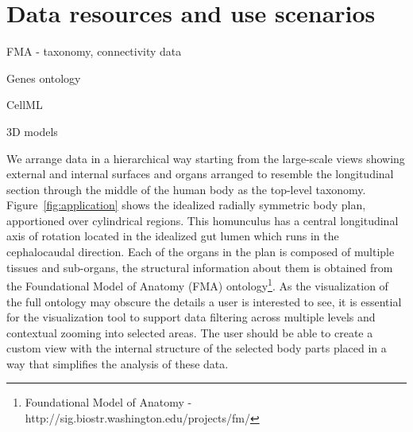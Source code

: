 \section{Data resources and use scenarios}
\label{sect:motivation}

FMA - taxonomy, connectivity data

Genes ontology
    
CellML

3D models


We arrange data in a hierarchical way starting from the large-scale views showing external and internal surfaces and organs 
arranged to resemble the longitudinal section through the middle of the human body as the top-level taxonomy. 
Figure~\ref{fig:application} shows the idealized radially symmetric body plan, apportioned over cylindrical regions.
This homunculus has a central longitudinal axis of rotation located in the idealized gut lumen which runs in the cephalocaudal direction.
Each of the organs in the plan is composed of multiple tissues and sub-organs, the structural information about them is obtained from the Foundational Model of Anatomy (FMA) ontology\footnote{Foundational Model of Anatomy -
\textsf{http://sig.biostr.washington.edu/projects/fm/}}. As the visualization of the full ontology may obscure the details a user is interested to see, it is essential for the visualization tool to support data filtering across multiple levels and contextual zooming into selected areas. The user should be able to create a custom view with the internal structure of the selected body parts placed in a way that simplifies the analysis of these data.

